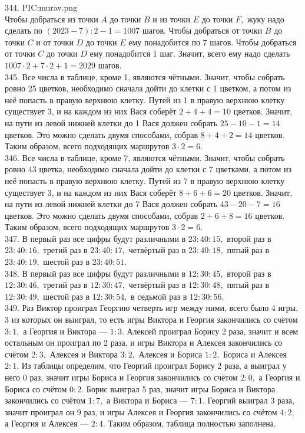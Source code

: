 344. {{PIC:murav.png}}\\
Чтобы добраться из точки $A$ до точки $B$ и из точки $E$ до точки $F,$ жуку надо сделать по $(2023-7):2-1=1007$ шагов. Чтобы добраться от точки $B$ до точки $C$ и от точки $D$ до точки $E$ ему понадобится по 7 шагов. Чтобы добраться от точки $C$ до точки $D$ ему понадобится 1 шаг. Значит, всего ему надо сделать $1007\cdot2+7\cdot2+1=2029$ шагов.\\
345. Все числа в таблице, кроме 1, являются чётными. Значит, чтобы собрать ровно 25 цветков, необходимо сначала дойти до клетки с 1 цветком, а потом из неё попасть в правую верхнюю клетку. Путей из 1 в правую верхнюю клетку существует 3, и на каждом из них Вася соберёт $2+4+4=10$ цветков. Значит, на пути из левой нижней клетки до 1 Вася должен собрать $25-10-1=14$ цветков. Это можно сделать двумя способами, собрав $8+4+2=14$ цветков. Таким образом, всего подходящих маршрутов $3\cdot2=6.$\\
346. Все числа в таблице, кроме 7, являются чётными. Значит, чтобы собрать ровно 43 цветка, необходимо сначала дойти до клетки с 7 цветками, а потом из неё попасть в правую верхнюю клетку. Путей из 7 в правую верхнюю клетку существует 3, и на каждом из них Вася соберёт $8+6+6=20$ цветков. Значит, на пути из левой нижней клетки до 7 Вася должен собрать $43-20-7=16$ цветков. Это можно сделать двумя способами, собрав $2+6+8=16$ цветков. Таким образом, всего подходящих маршрутов $3\cdot2=6.$\\
347. В первый раз все цифры будут различными в $23:40:15,$ второй раз в $23:40:16,$ третий раз в $23:40:17,$ четвёртый раз в $23:40:18,$ пятый раз в $23:40:19,$ шестой раз в $23:40:51.$\\
348. В первый раз все цифры будут различными в $12:30:45,$ второй раз в $12:30:46,$ третий раз в $12:30:47,$ четвёртый раз в $12:30:48,$ пятый раз в $12:30:49,$ шестой раз в $12:30:54,$ в седьмой раз в $12:30:56.$\\
349. Раз Виктор проиграл Георгию четверть игр между ними, всего было 4 игры, 3 из которых он выиграл, то есть игры Виктора и Георгия закончились со счётом $3:1,$ а Георгия и Виктора --- $1:3.$ Алексей проиграл Борису 2 раза, значит и всем остальным он проиграл по 2 раза, и игры Виктора и Алексея закончились со счётом $2:3,$ Алексея и Виктора $3:2,$ Алексея и Бориса $1:2,$ Бориса и Алексея $2:1.$ Из таблицы определим, что Георгий проиграл Борису 2 раза, а выиграл у него 0 раз, значит игры Бориса и Георгия закончились со счётом $2:0,$ а Георгия и Бориса со счётом $0:2.$ Борис выиграл 5 раз, значит игры Бориса и Виктора закончились со счётом $1:7,$ а Виктора и Бориса --- $7:1.$ Георгий выиграл 3 раза, значит проиграл он 9 раз, и игры Алексея и Георгия закончились со счётом $4:2,$ а Георгия и Алексея --- $2:4.$ Таким образом, таблица полностью заполнена.
